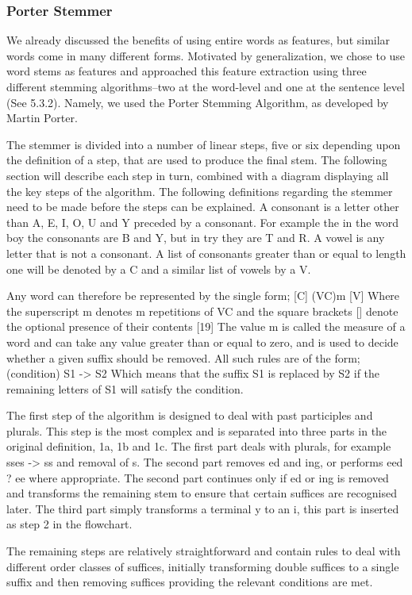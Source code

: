 \documentclass[preprint]{style}
\begin{document}
\subsubsection{Porter Stemmer}
We already discussed the benefits of using entire words as features, but similar words come in many different forms. Motivated by generalization, we chose to use word stems as features and approached this feature extraction using three different stemming algorithms--two at the word-level and one at the sentence level (See 5.3.2). Namely, we used the Porter Stemming Algorithm, as developed by Martin Porter. 

The stemmer is divided into a number of linear steps, five or six depending upon the definition of a step, that are used to produce the final stem. The following section will describe each step in turn, combined with a diagram displaying all the key steps of the algorithm. The following definitions regarding the stemmer need to be made before the steps can be explained. A consonant is a letter other than A, E, I, O, U and Y preceded by a consonant. For example the in the word boy the consonants are B and Y, but in try they are T and R. A vowel is any letter that is not a consonant. A list of consonants greater than or equal to length one will be denoted by a C and a similar list of vowels by a V.

Any word can therefore be represented by the single form; [C] (VC)m [V] Where the superscript m denotes m repetitions of VC and the square brackets [] denote the optional presence of their contents [19] The value m is called the measure of a word and can take any value greater than or equal to zero, and is used to decide whether a given suffix should be removed. All such rules are of the form; (condition) S1 -> S2 Which means that the suffix S1 is replaced by S2 if the remaining letters of S1 will satisfy the condition.

The first step of the algorithm is designed to deal with past participles and plurals. This step is the most complex and is separated into three parts in the original definition, 1a, 1b and 1c. The first part deals with plurals, for example sses -> ss and removal of s. The second part removes ed and ing, or performs eed ? ee where appropriate. The second part continues only if ed or ing is removed and transforms the remaining stem to ensure that certain suffices are recognised later. The third part simply transforms a terminal y to an i, this part is inserted as step 2 in the flowchart.

The remaining steps are relatively straightforward and contain rules to deal with different order classes of suffices, initially transforming double suffices to a single suffix and then removing suffices providing the relevant conditions are met.
\end{document}
